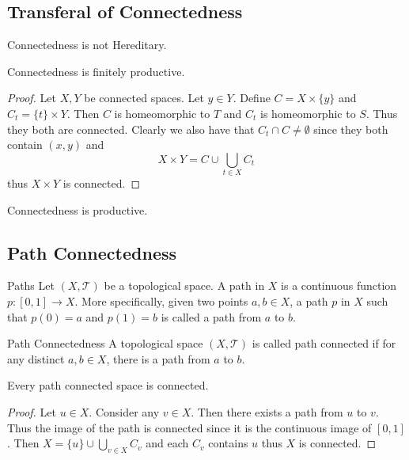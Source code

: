 \subsection{Transferal of Connectedness}
\begin{prp}{}{} Connectedness is not Hereditary. 
\end{prp}

\begin{prp}{}{} Connectedness is finitely productive. \tcbline
\begin{proof}
Let $X,Y$ be connected spaces. Let $y\in Y$. Define $C=X\times\{y\}$ and $C_t=\{t\}\times Y$. Then $C$ is homeomorphic to $T$ and $C_t$ is homeomorphic to $S$. Thus they both are connected. Clearly we also have that $C_t\cap C\neq\emptyset$ since they both contain $(x,y)$ and $$X\times Y=C\cup\bigcup_{t\in X}C_t$$ thus $X\times Y$ is connected. 
\end{proof}
\end{prp}

\begin{prp}{}{} Connectedness is productive. 
\end{prp}

\subsection{Path Connectedness}
\begin{defn}{Paths}{} Let $(X,\mathcal{T})$ be a topological space. A path in $X$ is a continuous function $p:[0,1]\to X$. More specifically, given two points $a,b\in X$, a path $p$ in $X$ such that $p(0)=a$ and $p(1)=b$ is called a path from $a$ to $b$. 
\end{defn}

\begin{defn}{Path Connectedness}{} A topological space $(X,\mathcal{T})$ is called path connected if for any distinct $a,b\in X$, there is a path from $a$ to $b$. 
\end{defn}

\begin{prp}{}{} Every path connected space is connected. \tcbline
\begin{proof}
Let $u\in X$. Consider any $v\in X$. Then there exists a path from $u$ to $v$. Thus the image of the path is connected since it is the continuous image of $[0,1]$. Then $X=\{u\}\cup\bigcup_{v\in X}C_v$ and each $C_v$ contains $u$ thus $X$ is connected. 
\end{proof}
\end{prp}

